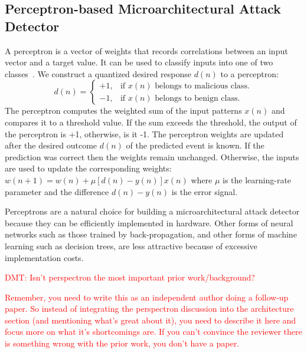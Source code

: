 \subsection{Perceptron-based Microarchitectural Attack Detector}
A perceptron is a vector of weights that records correlations between an input
vector and a target value. It can be used to classify inputs into one of two
classes~\cite{RosenblattPerceptron}. We construct a quantized desired response $d(n)$ to a perceptron:
\[
  d(n)=\begin{cases}
    +1, & \text{if $x(n)$ belongs to malicious class}.\\
    -1, & \text{if $x(n)$  belongs to benign class}.
  \end{cases}
\]
The perceptron computes the weighted sum of the input patterns $x(n)$ 
and compares it to a threshold value.
If the sum exceeds the threshold, the output of the perceptron is +1, otherwise, is it -1. 
The perceptron weights are updated after the desired outcome $d(n)$ of the predicted
event is known. If the prediction was correct then the weights remain unchanged. 
Otherwise, the inputs are used to update the corresponding weights:\\
$w(n+1)=w(n)+\mu[d(n)-y(n)]x(n)$
where $\mu$ is the learning-rate parameter and the difference $d(n)-y(n)$ is the 
error signal.

Perceptrons are a natural choice for building a microarchitectural attack
detector because they can be efficiently implemented in hardware. Other forms
of neural networks such as those trained by back-propagation, and other forms
of machine learning such as decision trees, are less attractive because of
excessive implementation costs. 

\textcolor{red}{DMT: Isn't perspectron the most important prior work/background?

Remember, you need to write this as an independent author doing a follow-up paper.  So instead
of integrating the perspectron discussion into the architecture section (and mentioning what's great
about it), you need to describe it here and focus more on what it's shortcomings are.  If you can't
convince the reviewer there is something wrong with the prior work, you don't have a paper.}